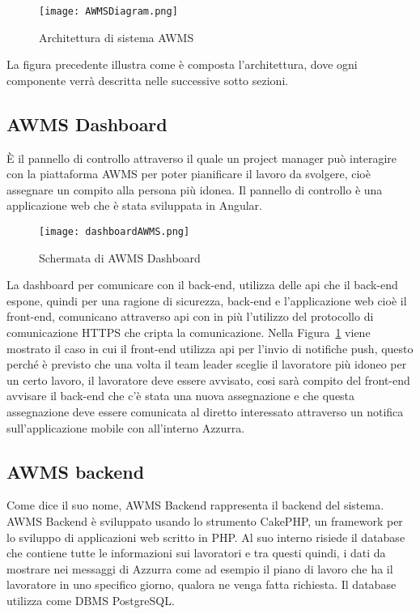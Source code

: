  \begin{figure}[h]
 	\begin{center}
 		\texttt{[image: AWMSDiagram.png]}
 		\caption{Architettura di sistema AWMS}\label{fig:arch}
 	\end{center}
 \end{figure}
La figura precedente illustra come è composta l'architettura, dove ogni componente verrà descritta nelle successive sotto sezioni.
\begin{trivlist}
	\item \subsection{AWMS Dashboard}
	È il pannello di controllo attraverso il quale un project manager può interagire con la piattaforma \gls{AWMS} per poter pianificare il lavoro da svolgere, cioè assegnare un compito alla persona più idonea. Il pannello di controllo è una applicazione web che è stata sviluppata in Angular.
	\begin{figure}[h] 
		\begin{center}
			\texttt{[image: dashboardAWMS.png]}
			\caption{Schermata di AWMS Dashboard}
		\end{center}
	\end{figure}
	 	La dashboard per comunicare con il back-end, utilizza delle \gls{api}\ap{[g]} che il back-end espone, quindi per una ragione di sicurezza, back-end e l'applicazione web cioè il front-end, comunicano attraverso \gls{api}\ap{[g]} con in più l'utilizzo del protocollo di comunicazione HTTPS che cripta la comunicazione. Nella Figura~\ref{fig:arch} viene mostrato il caso in cui il front-end utilizza \gls{api}\ap{[g]} per l'invio di notifiche push, questo perché è previsto che una volta il team leader sceglie il lavoratore più idoneo per un certo lavoro, il lavoratore deve essere avvisato, cosi sarà compito del front-end avvisare il back-end che c'è stata una nuova assegnazione e che questa assegnazione deve essere comunicata al diretto interessato attraverso un notifica sull'applicazione mobile con all'interno Azzurra.
	\item \subsection{AWMS backend}
	Come dice il suo nome, AWMS Backend rappresenta il backend del sistema. AWMS Backend è sviluppato usando lo strumento CakePHP, un framework per lo sviluppo di applicazioni web scritto in PHP. Al suo interno risiede il database che contiene tutte le informazioni sui lavoratori e tra questi quindi, i dati da mostrare nei messaggi di Azzurra come ad esempio il piano di lavoro che ha il lavoratore in uno specifico giorno, qualora ne venga fatta richiesta. Il database utilizza come DBMS PostgreSQL. \\

\end{trivlist}
